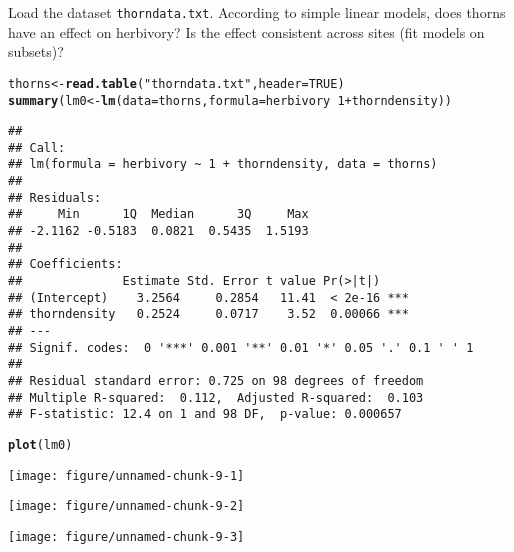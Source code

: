 \documentclass[12pt,a4paper]{scrartcl}\usepackage[]{graphicx}\usepackage[]{color}
\makeatletter
\def\maxwidth{ %
  \ifdim\Gin@nat@width>\linewidth
    \linewidth
  \else
    \Gin@nat@width
  \fi
}
\newcommand{\hlnum}[1]{\textcolor[rgb]{0.686,0.059,0.569}{#1}}%
\newcommand{\hlstr}[1]{\textcolor[rgb]{0.192,0.494,0.8}{#1}}%
\newcommand{\hlopt}[1]{\textcolor[rgb]{0,0,0}{#1}}%
\newcommand{\hlstd}[1]{\textcolor[rgb]{0.345,0.345,0.345}{#1}}%
\newcommand{\hlkwb}[1]{\textcolor[rgb]{0.69,0.353,0.396}{#1}}%
\newcommand{\hlkwc}[1]{\textcolor[rgb]{0.333,0.667,0.333}{#1}}%
\newcommand{\hlkwd}[1]{\textcolor[rgb]{0.737,0.353,0.396}{\textbf{#1}}}%
\newenvironment{kframe}{%
 \def\at@end@of@kframe{}%
 \ifinner\ifhmode%
  \def\at@end@of@kframe{\end{minipage}}%
  \begin{minipage}{\columnwidth}%
 \fi\fi%
 \def\FrameCommand##1{\hskip\@totalleftmargin \hskip-\fboxsep
 \colorbox{shadecolor}{##1}\hskip-\fboxsep
     \hskip-\linewidth \hskip-\@totalleftmargin \hskip\columnwidth}%
 \MakeFramed {\advance\hsize-\width
   \@totalleftmargin\z@ \linewidth\hsize
   \@setminipage}}%
 {\par\unskip\endMakeFramed%
 \at@end@of@kframe}
\newenvironment{knitrout}{}{} %
\makeatother
\begin{document}
\begin{Exercise}[difficulty=1, title={Simpson's paradox}]
Load the dataset \texttt{thorndata.txt}. According to simple linear models, does thorns have an effect on herbivory? Is the effect consistent across sites (fit models on subsets)? 
\end{Exercise}
\begin{Answer}
\begin{knitrout}
\color{fgcolor}\begin{kframe}
\begin{alltt}
\hlstd{thorns} \hlkwb{<-} \hlkwd{read.table}\hlstd{(}\hlstr{"thorndata.txt"}\hlstd{,} \hlkwc{header} \hlstd{=} \hlnum{TRUE}\hlstd{)}
\hlkwd{summary}\hlstd{(lm0} \hlkwb{<-} \hlkwd{lm}\hlstd{(}\hlkwc{data} \hlstd{= thorns,} \hlkwc{formula} \hlstd{= herbivory} \hlopt{~} \hlnum{1}\hlopt{+}\hlstd{thorndensity ))}
\end{alltt}
\begin{verbatim}
## 
## Call:
## lm(formula = herbivory ~ 1 + thorndensity, data = thorns)
## 
## Residuals:
##     Min      1Q  Median      3Q     Max 
## -2.1162 -0.5183  0.0821  0.5435  1.5193 
## 
## Coefficients:
##              Estimate Std. Error t value Pr(>|t|)    
## (Intercept)    3.2564     0.2854   11.41  < 2e-16 ***
## thorndensity   0.2524     0.0717    3.52  0.00066 ***
## ---
## Signif. codes:  0 '***' 0.001 '**' 0.01 '*' 0.05 '.' 0.1 ' ' 1
## 
## Residual standard error: 0.725 on 98 degrees of freedom
## Multiple R-squared:  0.112,	Adjusted R-squared:  0.103 
## F-statistic: 12.4 on 1 and 98 DF,  p-value: 0.000657
\end{verbatim}
\begin{alltt}
\hlkwd{plot}\hlstd{(lm0)}
\end{alltt}
\end{kframe}
\texttt{[image: figure/unnamed-chunk-9-1]} 

\texttt{[image: figure/unnamed-chunk-9-2]} 

\texttt{[image: figure/unnamed-chunk-9-3]} 


\end{knitrout}
\end{Answer}
\end{document}
